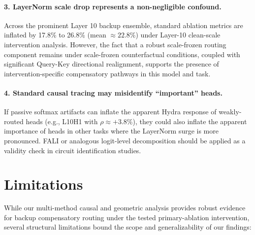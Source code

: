 \documentclass[12pt,a4paper]{article}
\begin{document}
\paragraph{3. LayerNorm scale drop represents a non-negligible confound.}
Across the prominent Layer 10 backup ensemble, standard ablation metrics are inflated by 17.8\% to 26.8\% (mean $\approx 22.8\%$) under Layer-10 clean-scale intervention analysis. However, the fact that a robust scale-frozen routing component remains under scale-frozen counterfactual conditions, coupled with significant Query-Key directional realignment, supports the presence of intervention-specific compensatory pathways in this model and task.

\paragraph{4. Standard causal tracing may misidentify ``important'' heads.}
If passive softmax artifacts can inflate the apparent Hydra response of
weakly-routed heads (e.g., L10H1 with $\rho \approx +3.8\%$), they could also
inflate the apparent importance of heads in other tasks where the LayerNorm
surge is more pronounced. FALI or analogous logit-level decomposition should be
applied as a validity check in circuit identification studies.

\section{Limitations}
\label{sec:limitations}

While our multi-method causal and geometric analysis provides robust evidence for backup compensatory routing under the tested primary-ablation intervention, several structural limitations bound the scope and generalizability of our findings:
\end{document}
